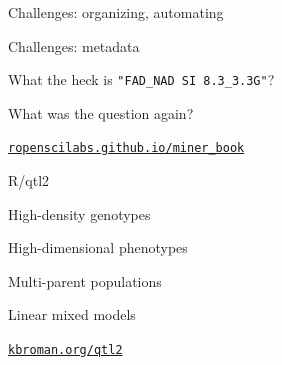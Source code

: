 \documentclass[12pt,t]{beamer}
\begin{document}
\begin{frame}[c]{Challenges: {\color{foreground} organizing, automating}}


\end{frame}


\begin{frame}[c]{Challenges: {\color{foreground} metadata}}


  \centerline{What the heck is {\hilit \tt "FAD\_NAD SI 8.3\_3.3G"}?}

\end{frame}



\begin{frame}[c]{}
\centerline{\Large What was the question again?}
\end{frame}



\begin{frame}[c]{}

  \vspace*{5mm}



\vspace{3mm}

\hfill \href{https://ropenscilabs.github.io/miner_book}{\scriptsize \lolit \tt ropenscilabs.github.io/miner\_book}

\end{frame}



\begin{frame}[c]{R/qtl2}

\vspace*{-16.2mm}

  \vspace{21mm}

  \bbi
\item High-density genotypes
\item High-dimensional phenotypes
\item Multi-parent populations
\item Linear mixed models
  \ei

  \vspace{25mm}

\hfill \href{http://kbroman.org/qtl2}{\small \tt kbroman.org/qtl2}

\end{frame}
\end{document}

